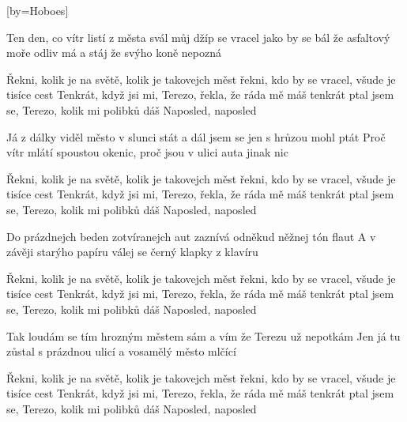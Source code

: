 [by={Hoboes}]

\beginverse{}
Ten den, co vítr listí z města svál
můj džíp se vracel jako by se bál
že asfaltový moře odliv má a stáj že svýho koně nepozná
\endverse{}

\beginchorus{}
Řekni, kolik je na světě, kolik je takovejch měst
řekni, kdo by se vracel, všude je tisíce cest
Tenkrát, když jsi mi, Terezo, řekla, že ráda mě máš
tenkrát ptal jsem se, Terezo, kolik mi polibků dáš
Naposled, naposled
\endchorus{}

\beginverse{}
Já z dálky viděl město v slunci stát
a dál jsem se jen s hrůzou mohl ptát
Proč vítr mlátí spoustou okenic, proč jsou v ulici auta jinak nic
\endverse{}

\beginchorus{}
Řekni, kolik je na světě, kolik je takovejch měst
řekni, kdo by se vracel, všude je tisíce cest
Tenkrát, když jsi mi, Terezo, řekla, že ráda mě máš
tenkrát ptal jsem se, Terezo, kolik mi polibků dáš
Naposled, naposled
\endchorus{}

\beginverse{}
Do prázdnejch beden zotvíranejch aut
zaznívá odněkud něžnej tón flaut
A v závěji starýho papíru válej se černý klapky z klavíru
\endverse{}

\beginchorus{}
Řekni, kolik je na světě, kolik je takovejch měst
řekni, kdo by se vracel, všude je tisíce cest
Tenkrát, když jsi mi, Terezo, řekla, že ráda mě máš
tenkrát ptal jsem se, Terezo, kolik mi polibků dáš
Naposled, naposled
\endchorus{}

\beginverse{}
Tak loudám se tím hrozným městem sám
a vím že Terezu už nepotkám
Jen já tu zůstal s prázdnou ulicí a vosamělý město mlčící
\endverse{}

\beginchorus{}
Řekni, kolik je na světě, kolik je takovejch měst
řekni, kdo by se vracel, všude je tisíce cest
Tenkrát, když jsi mi, Terezo, řekla, že ráda mě máš
tenkrát ptal jsem se, Terezo, kolik mi polibků dáš
Naposled, naposled
\endchorus{}

\endsong{}
